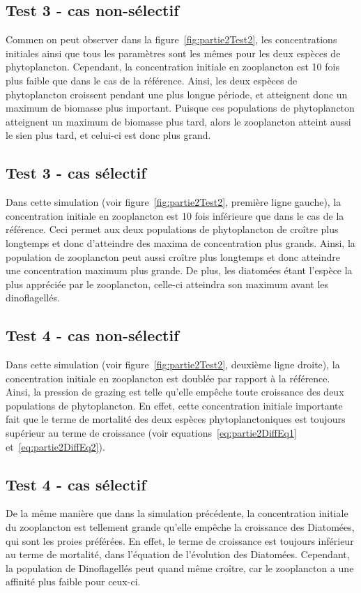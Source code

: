 \subsection{Test 3 - cas non-sélectif}
\par{
Commen on peut observer dans la figure~\ref{fig:partie2Test2},
les concentrations initiales ainsi que tous les paramètres sont les mêmes pour les deux espèces
de phytoplancton. Cependant, la concentration initiale en zooplancton est 10 fois plus faible que
dans le cas de la référence. Ainsi, les deux espèces de phytoplancton croissent pendant une plus longue
période, et atteignent donc un maximum de biomasse plus important. Puisque ces populations de
phytoplancton atteignent un maximum de biomasse plus tard, alors le zooplancton atteint aussi le sien
plus tard, et celui-ci est donc plus grand. 
}

\subsection{Test 3 - cas sélectif}
\par{
Dans cette simulation (voir figure~\ref{fig:partie2Test2}, première ligne gauche), la concentration initiale
en zooplancton est 10 fois inférieure que dans le cas
de la référence. Ceci permet aux deux populations de phytoplancton de croître plus longtemps et donc
d'atteindre des maxima de concentration plus grands. Ainsi, la population de zooplancton peut aussi
croître plus longtemps et donc atteindre une concentration maximum plus grande. De plus, les diatomées
étant l'espèce la plus appréciée par le zooplancton, celle-ci atteindra son maximum avant les dinoflagellés.
}

\subsection{Test 4 - cas non-sélectif}
\par{
Dans cette simulation (voir figure~\ref{fig:partie2Test2}, deuxième ligne droite), la concentration initiale
en zooplancton est doublée par rapport à la référence.
Ainsi, la pression de grazing est telle qu'elle empêche toute croissance des deux populations de phytoplancton.
En effet, cette concentration initiale importante fait que le terme de mortalité des deux espèces
phytoplanctoniques est toujours supérieur au terme de croissance (voir equations~\ref{eq:partie2DiffEq1}
et~\ref{eq:partie2DiffEq2}).
}

\subsection{Test 4 - cas sélectif}
\par{
De la même manière que dans la simulation précédente, la concentration initiale du zooplancton
est tellement grande qu'elle empêche la croissance des Diatomées, qui sont les proies préférées.
En effet, le terme de croissance est toujours inférieur au terme de mortalité, dans l'équation de
l'évolution des Diatomées. Cependant, la population de Dinoflagellés peut quand même croître, car
le zooplancton a une affinité plus faible pour ceux-ci.
}

